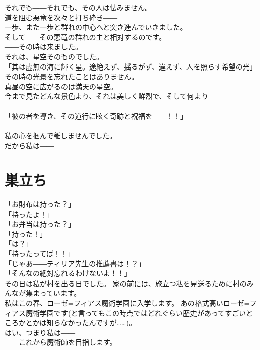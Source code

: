\documentclass[oneside, a4paper]{jsbook}
\begin{document}
それでも――それでも、その人は怯みません。\\
道を阻む悪竜を次々と打ち砕き――\\
一歩、また一歩と群れの中心へと突き進んでいきました。\\

そして――その悪竜の群れの主と相対するのです。\\

――その時は来ました。\\
それは、星空そのものでした。\\

\noindent
「其は虚無の海に輝く星。途絶えず、揺るがず、違えず、人を照らす希望の光」\\

その時の光景を忘れたことはありません。\\
真昼の空に広がるのは満天の星空。\\
今まで見たどんな景色より、それは美しく鮮烈で、そして何より――\\\\
「彼の者を導き、その道行に眩く奇跡と祝福を――！！」\\\\
私の心を掴んで離しませんでした。\\
だから私は――
\newpage
\section{巣立ち}

\noindent
「お財布は持った？」\\
「持ったよ！」\\
「お弁当は持った？」\\
「持った！」\\
「は？」\\
「持ったってば！！」\\
「じゃあ――ティリア先生の推薦書は！？」\\
「そんなの絶対忘れるわけないよ！！」\\

その日は私が村を出る日でした。
家の前には、旅立つ私を見送るために村のみんなが集まっています。\\
私はこの春、ローゼ=フィアス魔術学園に入学します。
あの格式高いローゼ=フィアス魔術学園です(と言ってもこの時点ではどれぐらい歴史があってすごいところかとかは知らなかったんですが……)。\\
はい、つまり私は――\\

――これから魔術師を目指します。\\
\end{document}
